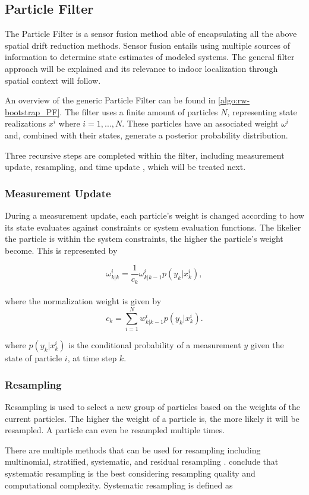 \subsection{Particle Filter}
\label{sec:rw-pf}

The Particle Filter is a sensor fusion method able of encapsulating all the above spatial drift reduction methods. Sensor fusion entails using multiple sources of information to determine state estimates of modeled systems. The general filter approach will be explained and its relevance to indoor localization through spatial context will follow.\par
An overview of the generic Particle Filter can be found in \cref{algo:rw-bootstrap_PF}.  The filter uses a finite amount of particles $N$, representing state realizations $x^i$ where $i = 1,...,N$. These particles have an associated weight $\omega^i$ and, combined with their states, generate a posterior probability distribution. \par 
Three recursive steps are completed within the filter, including measurement update, resampling, and time update \cite{Wu2019,Woodman2008}, which will be treated next.

\subsubsection{Measurement Update}
During a measurement update, each particle's weight is changed according to how its state evaluates against constraints or system evaluation functions. The likelier the particle is within the system constraints, the higher the particle's weight become. This is represented by

\begin{equation}
	\omega^i_{k|k} = \frac{1}{c_k} \omega^i_{k|k-1} p(y_k|x^i_k),
\end{equation}\\
where the normalization weight is given by
\begin{equation}
	c_{k}=\sum_{i=1}^{N} w_{k | k-1}^{i} p\left(y_{k} | x_{k}^{i}\right).
	\label{eq:PF_probability density}
\end{equation}

where $p(y_k|x_k^i)$ is the conditional probability of a measurement $y$ given the state of particle $i$, at time step $k$.

\subsubsection{Resampling}
Resampling is used to select a new group of particles based on the weights of the current particles. The higher the weight of a particle is, the more likely it will be resampled. A particle can even be resampled multiple times. \par 
There are multiple methods that can be used for resampling including multinomial, stratified, systematic, and	residual resampling \cite{hol2006resampling,gustafsson2010statistical}. \citet{hol2006resampling} conclude that  systematic resampling is the best considering resampling quality and computational complexity. Systematic resampling is defined as 

